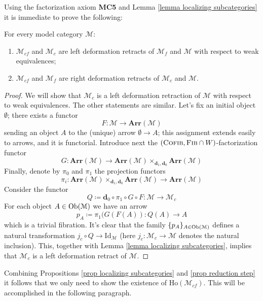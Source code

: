 \begin{refsection}
Using the factorization axiom {\bfseries MC5} and Lemma \ref{lemma localizing subcategories} it is immediate to prove the following:

\begin{prop} \label{prop reduction step}
For every model category $\mathcal M$:
\begin{enumerate}
\item $\mathcal M_{cf}$ and $\mathcal M_c$ are left deformation retracts of $\mathcal M_f$ and $\mathcal M$ with respect to weak equivalences;
\item $\mathcal M_{cf}$ and $\mathcal M_f$ are right deformation retracts of $\mathcal M_c$ and $\mathcal M$.
\end{enumerate}
\end{prop}

\begin{proof}
We will show that $\mathcal M_c$ is a left deformation retraction of $\mathcal M$ with respect to weak equivalences. The other statements are similar. Let's fix an initial object $\emptyset$; there exists a functor
\[
F \colon \mathcal M \to \mathbf{Arr}(\mathcal M)
\]
sending an object $A$ to the (unique) arrow $\emptyset \to A$; this assignment extends easily to arrows, and it is functorial. Introduce next the $(\textsc{Cofib},\textsc{Fib} \cap W)$-factorization functor
\[
G \colon \mathbf{Arr}(\mathcal M) \to \mathbf{Arr}(\mathcal M) \times_{\mathbf d_1, \mathbf d_0} \mathbf{Arr}(\mathcal M)
\]
Finally, denote by $\pi_0$ and $\pi_1$ the projection functors
\[
\pi_i \colon \mathbf{Arr}(\mathcal M) \times_{\mathbf d_1, \mathbf d_0} \mathbf{Arr}(\mathcal M) \to \mathbf{Arr}(\mathcal M)
\]
Consider the functor
\[
Q\coloneqq \mathbf d_0 \circ \pi_1 \circ G \circ F \colon \mathcal M \to \mathcal M_c
\]
For each object $A \in \operatorname{Ob}(\mathcal M)$ we have an arrow
\[
p_A\coloneqq \pi_1(G(F(A)) \colon Q(A) \to A
\]
which is a trivial fibration. It's clear that the family $\{p_A\}_{A \in \operatorname{Ob}(\mathcal M)}$ defines a natural transformation $j_c \circ Q \to \mathrm{Id}_{\mathcal M}$ (here $j_c \colon \mathcal M_c \to \mathcal M$ denotes the natural inclusion). This, together with Lemma \ref{lemma localizing subcategories}, implies that $\mathcal M_c$ is a left deformation retract of $\mathcal M$.
\end{proof}

Combining Propositions \ref{prop localizing subcategories} and \ref{prop reduction step} it follows that we only need to show the existence of $\mathrm{Ho}(\mathcal M_{cf})$. This will be accomplished in the following paragraph.


\end{refsection}
